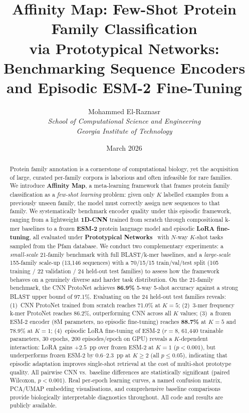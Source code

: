 \documentclass[11pt,a4paper]{article}
\title{
  \textbf{Affinity Map: Few-Shot Protein Family Classification\\
  via Prototypical Networks: Benchmarking Sequence Encoders\\
  and Episodic ESM-2 Fine-Tuning}
}
\author{
  Mohammed El-Raznasr\\
  \textit{School of Computational Science and Engineering}\\
  \textit{Georgia Institute of Technology}
}
\date{March 2026}
\begin{document}
\maketitle
\thispagestyle{empty}

\begin{abstract}
Protein family annotation is a cornerstone of computational biology, yet the
acquisition of large, curated per-family corpora is laborious and often
infeasible for rare families.  We introduce \textbf{Affinity Map}, a meta-learning
framework that frames protein family classification as a \emph{few-shot learning}
problem: given only $K$ labelled examples from a previously unseen family, the
model must correctly assign new sequences to that family.  We systematically
benchmark encoder quality under this episodic framework, ranging from a
lightweight \textbf{1D-CNN} trained from scratch through compositional k-mer
baselines to a frozen \textbf{ESM-2} protein language model and episodic
\textbf{LoRA fine-tuning}, all evaluated under
\textbf{Prototypical Networks}~\cite{snell2017prototypical} with $N$-way
$K$-shot tasks sampled from the Pfam database.
We conduct two complementary experiments: a \emph{small-scale} 21-family
benchmark with full BLAST/k-mer baselines, and a \emph{large-scale} 155-family
scale-up (13,146 sequences) with a 70/15/15 train/val/test split
(105 training / 22 validation / 24 held-out test families)
to assess how the framework behaves on a genuinely diverse and harder task
distribution.  On the 21-family benchmark, the CNN ProtoNet achieves
\textbf{86.9\%} 5-way 5-shot accuracy against a strong BLAST upper bound
of 97.1\%.  Evaluating on the 24 held-out test families reveals: (1)~CNN ProtoNet
trained from scratch reaches 71.0\% at $K=5$; (2)~3-mer frequency k-mer
ProtoNet reaches 86.2\%, outperforming CNN across all $K$ values;
(3)~a frozen ESM-2 encoder (8M parameters, no episodic fine-tuning) reaches
\textbf{88.7\%} at $K=5$ and 78.9\% at $K=1$; (4)~episodic LoRA fine-tuning
of ESM-2 ($r=8$, 61,440 trainable parameters, 30 epochs, 200 episodes/epoch on
GPU) reveals a $K$-dependent interaction: LoRA gains $+2.5$~pp over frozen
ESM-2 at $K=1$ ($p < 0.001$), but underperforms frozen ESM-2 by 0.6--2.3~pp at
$K \geq 2$ (all $p \leq 0.05$), indicating that episodic adaptation improves
single-shot retrieval at the cost of multi-shot prototype quality.
All pairwise CNN vs.\ baseline differences are statistically significant
(paired Wilcoxon, $p < 0.001$).  Real per-epoch
learning curves, a named confusion matrix, PCA/UMAP embedding visualisations,
and comprehensive baseline comparisons provide biologically interpretable
diagnostics throughout.
All code and results are publicly available.
\end{abstract}
\end{document}

